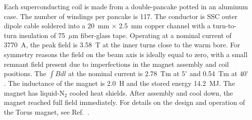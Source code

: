 \documentclass[final,3p,twocolumn]{elsarticle}
\begin{document}
Each superconducting coil is made from a double-pancake potted in an aluminum case. The number of windings per
pancake is 117. The conductor is SSC outer dipole cable soldered into a 20~mm $\times$ 2.5~mm copper channel with
a turn-to-turn insulation of 75~$\mu$m fiber-glass tape. Operating at a nominal current of 3770~A, the peak field is
3.58~T at the inner turns close to the warm bore. For symmetry reasons the field on the beam axis is ideally equal to
zero, with a small remnant field present due to imperfections in the magnet assembly and coil positions. The $\int {Bdl}$
at the nominal current is 2.78~Tm at $5^\circ$ and 0.54~Tm at $40^\circ$. The inductance of the magnet is 2.0~H
and the stored energy 14.2~MJ. The magnet has liquid-N$_2$ cooled heat shields. After assembly and cool down,
the magnet reached full field immediately. For details on the design and operation of the Torus magnet, see
Ref.~\cite{clas12-magnets}.
\end{document}
